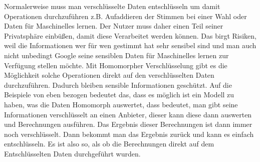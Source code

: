 \label{sec:einführung}
Normalerweise muss man verschlüsselte Daten entschlüsseln um damit Operationen durchzuführen z.B. Aufaddieren der Stimmen bei einer Wahl oder Daten für Maschinelles lernen. Der Nutzer muss daher einen Teil seiner Privatsphäre einbüßen, damit diese Verarbeitet werden können. Das birgt Risiken, weil die Informationen wer für wen gestimmt hat sehr sensibel sind und man auch nicht unbedingt Google seine sensiblen Daten für Maschinelles lernen zur Verfügung stellen möchte. Mit Homomorpher Verschlüsselung gibt es die Möglichkeit solche Operationen direkt auf den verschlüsselten Daten durchzuführen. Dadurch bleiben sensible Informationen geschützt. Auf die Beispiele von eben bezogen bedeutet das, dass es möglich ist ein Modell zu haben, was die Daten Homomorph auswertet, dass bedeutet, man gibt seine Informationen verschlüsselt an einen Anbieter, dieser kann diese dann auswerten und Berechnungen ausführen. Das Ergebnis dieser Berechnungen ist dann immer noch verschlüsselt. Dann bekommt man das Ergebnis zurück und kann es einfach entschlüsseln. Es ist also so, als ob die Berechnungen direkt auf dem Entschlüsselten Daten durchgeführt wurden.